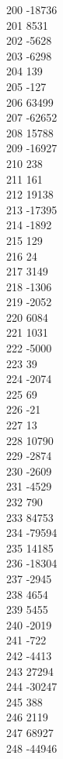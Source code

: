 { 200	-18736 \\
 201	8531 \\
 202	-5628 \\
 203	-6298 \\
 204	139 \\
 205	-127 \\
 206	63499 \\
 207	-62652 \\
 208	15788 \\
 209	-16927 \\
 210	238 \\
 211	161 \\
 212	19138 \\
 213	-17395 \\
 214	-1892 \\
 215	129 \\
 216	24 \\
 217	3149 \\
 218	-1306 \\
 219	-2052 \\
 220	6084 \\
 221	1031 \\
 222	-5000 \\
 223	39 \\
 224	-2074 \\
 225	69 \\
 226	-21 \\
 227	13 \\
 228	10790 \\
 229	-2874 \\
 230	-2609 \\
 231	-4529 \\
 232	790 \\
 233	84753 \\
 234	-79594 \\
 235	14185 \\
 236	-18304 \\
 237	-2945 \\
 238	4654 \\
 239	5455 \\
 240	-2019 \\
 241	-722 \\
 242	-4413 \\
 243	27294 \\
 244	-30247 \\
 245	388 \\
 246	2119 \\
 247	68927 \\
 248	-44946 \\
}
